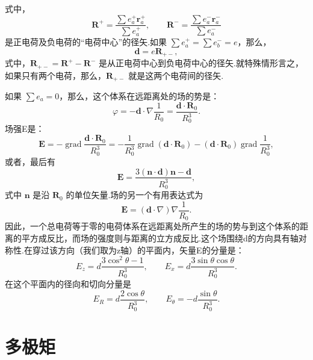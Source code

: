 式中，
\begin{equation}
  \boldsymbol{R}^+=\frac{\sum e_a^+\boldsymbol{r}_a^+}{\sum e_a^+},\qquad
  \boldsymbol{R}^-=\frac{\sum e_a^-\boldsymbol{r}_a^-}{\sum e_a^-}
\end{equation}
是正电荷及负电荷的“电荷中心”的径矢.如果 $\sum e_a^+ = \sum e_b^- = e$，那么，
\begin{equation}
  \boldsymbol{d}=e\boldsymbol{R}_{+-},
\end{equation}
式中，$\boldsymbol{R}_{+-}=\boldsymbol{R}^+-\boldsymbol{R}^-$ 是从正电荷中心到负电荷中心的径矢.就特殊情形言之，如果只有两个电荷，那么，$\boldsymbol{R}_{+-}$ 就是这两个电荷间的径矢.

如果 $\sum e_a = 0$，那么，这个体系在远距离处的场的势是：
\begin{equation}
  \varphi=-\boldsymbol{d}\cdot\nabla\frac{1}{R_0}
  =\frac{\boldsymbol{d}\cdot\boldsymbol{R}_0}{R_0^3}.
\end{equation}
场强E是：
\begin{equation*}
  \boldsymbol{E}=-\operatorname{grad}\frac{\boldsymbol{d}\cdot\boldsymbol{R}_0}{R_0^3}
  =-\frac{1}{R_0^3}\operatorname{grad}(\boldsymbol{d}\cdot\boldsymbol{R}_0)
  -(\boldsymbol{d}\cdot\boldsymbol{R}_0)\operatorname{grad}\frac{1}{R_0^3},
\end{equation*}
或者，最后有
\begin{equation}
  \boldsymbol{E}=\frac{3(\boldsymbol{n}\cdot\boldsymbol{d})\boldsymbol{n}-\boldsymbol{d}}{R_0^3},
\end{equation}
式中 $\boldsymbol{n}$ 是沿 $\boldsymbol{R}_0$ 的单位矢量.场的另一个有用表达式为
\begin{equation}
  \boldsymbol{E}=(\boldsymbol{d}\cdot\nabla)\nabla\frac{1}{R_0}.
\end{equation}
因此，一个总电荷等于零的电荷体系在远距离处所产生的场的势与到这个体系的距离的平方成反比，而场的强度则与距离的立方成反比.这个场围绕d的方向具有轴对称性.在穿过该方向（我们取为z轴）的平面内，矢量E的分量是：
\begin{equation}
  E_z=d\frac{3\cos^2\theta-1}{R_0^3},\qquad
  E_x=d\frac{3\sin\theta\cos\theta}{R_0^3}.
\end{equation}
在这个平面内的径向和切向分量是
\begin{equation}
  E_R=d\frac{2\cos\theta}{R_0^3},\qquad
  E_\theta=-d\frac{\sin\theta}{R_0^3}.
\end{equation}

\section{多极矩}

